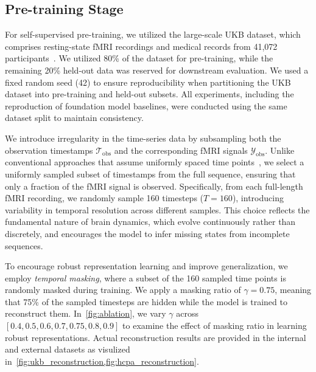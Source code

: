 \subsection{Pre-training Stage}






For self-supervised pre-training, we utilized the large-scale UKB dataset, which comprises resting-state fMRI recordings and medical records from 41,072 participants~\citep{alfaro2018image}. We utilized 80\% of the dataset for pre-training, while the remaining 20\% held-out data was reserved for downstream evaluation. We used a fixed random seed (42) to ensure reproducibility when partitioning the UKB dataset into pre-training and held-out subsets. All experiments, including the reproduction of foundation model baselines, were conducted using the same dataset split to maintain consistency. 

We introduce irregularity in the time-series data by subsampling both the observation timestamps \(\mathcal{T}_{\text{obs}}\) and the corresponding fMRI signals \(\mathcal{Y}_{\text{obs}}\). Unlike conventional approaches that assume uniformly spaced time points~\citep{caro2024brainlm, dong2024brain}, we select a uniformly sampled subset of timestamps from the full sequence, ensuring that only a fraction of the fMRI signal is observed. Specifically, from each full-length fMRI recording, we randomly sample 160 timesteps ($T = 160$), introducing variability in temporal resolution across different samples. This choice reflects the fundamental nature of brain dynamics, which evolve continuously rather than discretely, and encourages the model to infer missing states from incomplete sequences. 



To encourage robust representation learning and improve generalization, we employ \textit{temporal masking}, where a subset of the 160 sampled time points is randomly masked during training. We apply a masking ratio of \(\gamma = 0.75\), meaning that 75\% of the sampled timesteps are hidden while the model is trained to reconstruct them. In~\cref{fig:ablation}, we vary $\gamma$ across $[0.4, 0.5, 0.6, 0.7, 0.75, 0.8, 0.9]$ to examine the effect of masking ratio in learning robust representations. Actual reconstruction results are provided in the internal and external datasets as visulized in~\cref{fig:ukb_reconstruction,fig:hcpa_reconstruction}.

